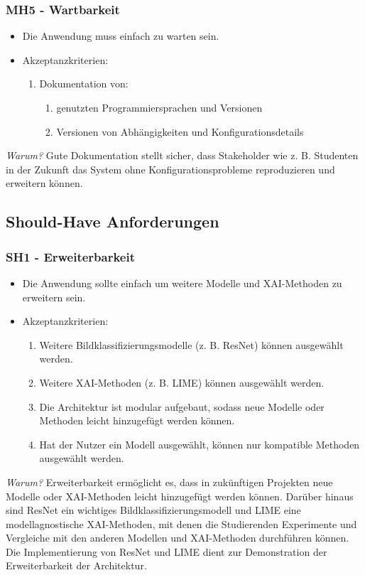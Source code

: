 \subsubsection{MH5 - Wartbarkeit}
\begin{itemize}
    \item Die Anwendung muss einfach zu warten sein.
    \item Akzeptanzkriterien:
    \begin{enumerate}
        \item Dokumentation von:
            \begin{enumerate}
                \item genutzten Programmiersprachen und Versionen
                \item Versionen von Abhängigkeiten und Konfigurationsdetails
            \end{enumerate}
    \end{enumerate}
\end{itemize}
\textit{Warum?} Gute Dokumentation stellt sicher, dass Stakeholder wie z. B. Studenten in der Zukunft das System ohne Konfigurationsprobleme reproduzieren und erweitern können.

\subsection{Should-Have Anforderungen}

\subsubsection{SH1 - Erweiterbarkeit}
\begin{itemize}
    \item Die Anwendung sollte einfach um weitere Modelle und XAI-Methoden zu erweitern sein.
    \item Akzeptanzkriterien:
    \begin{enumerate}
        \item Weitere Bildklassifizierungsmodelle (z. B. ResNet) können ausgewählt werden.
        \item Weitere XAI-Methoden (z. B. LIME) können ausgewählt werden.
        \item Die Architektur ist modular aufgebaut, sodass neue Modelle oder Methoden leicht hinzugefügt werden können. 
        \item Hat der Nutzer ein Modell ausgewählt, können nur kompatible Methoden ausgewählt werden.
    \end{enumerate}
\end{itemize}
\textit{Warum?} Erweiterbarkeit ermöglicht es, dass in zukünftigen Projekten neue Modelle oder XAI-Methoden leicht hinzugefügt werden können.
Darüber hinaus sind ResNet ein wichtiges Bildklassifizierungsmodell und LIME eine modellagnostische XAI-Methoden, mit denen die Studierenden Experimente und Vergleiche mit den anderen Modellen und XAI-Methoden durchführen können. Die Implementierung von ResNet und LIME dient zur Demonstration der Erweiterbarkeit der Architektur. 

